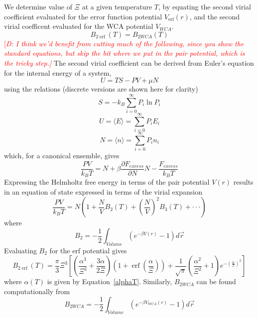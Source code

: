 \documentclass[double,12pt]{beavtex}
\newcommand\davidsays[1]{\textcolor{red}{[\it D: #1]}}
\begin{document}
We determine value of $\Xi$ at a given temperature $T$,
by equating the second virial coefficient evaluated for the error function 
potential $V_{\operatorname{erf}}(r)$, and the second virial coefficent evaluated for the 
WCA potential $V_{WCA}$.
\begin{equation}B_{2\operatorname{erf}}(T) =B_{2WCA}(T)\end{equation}
\davidsays{I think we'd benefit from cutting much of the following, since you
show the standard equations, but skip the bit where we put in the pair potential,
which is the tricky step.}
The second virial coefficient can be derived from Euler's equation for 
the internal energy of a system, 
\begin{equation}U=TS-PV+\mu{N}\end{equation}
using the relations (discrete versions are shown here for clarity)
\begin{equation}S=-k_B\sum_{i=0}^\infty{P_i\ln{P_i}}\end{equation}
\begin{equation}U=\langle E\rangle=\sum_{i=0}^\infty{P_iE_i}\end{equation}
\begin{equation}N=\langle n\rangle=\sum_{i=0}^\infty{P_in_i}\end{equation}
which, for a canonical ensemble, gives
\begin{equation}\frac{PV}{k_BT}=N + \beta\frac{\partial{F}_{excess}}{\partial{N}}{N} - \frac{F_{excess}}{k_BT}\end{equation}
Expressing the Helmholtz free energy in terms of the pair potential 
$V(r)$ results in an equation of state expressed in terms of the virial expansion 
\begin{equation}\label{virialequation}
    \frac{PV}{k_BT}=N\left(1+\frac{N}{V}B_2(T)+\left(\frac{N}{V}\right)^2B_3(T)+ \cdot\cdot\cdot\right) 
\end{equation}
where 
\begin{equation}
	B_{2}=-\frac{1}{2}\int_{Volume}\left(e^{-\beta{V}(r)}-1\right)d\vec{r} 
\end{equation}
Evaluating $B_{2}$ for the erf potential gives
\begin{equation}
	B_{2\operatorname{erf}}(T) = \frac{\pi}{3}\Xi^3\left[\left(\frac{\alpha^3}{\Xi^3}+\frac{3\alpha}{2\Xi}\right)\left(1+\operatorname{\operatorname{erf}}\left(\frac{\alpha}{\Xi}\right)\right)+\frac{1}{\sqrt{\pi}}\left(\frac{\alpha^2}{\Xi^2}+1\right)e^{-\left(\frac{\alpha}{\Xi}\right)^2}\right]
\end{equation}
where $\alpha(T)$ is given by Equation~\ref{alphaT}. Similarly, 
$B_{2WCA}$ can be found computationally from 
\begin{equation}
	B_{2WCA}=-\frac{1}{2}\int_{Volume}\left(e^{-\beta{V}_{WCA}(r)}-1\right)d\vec{r} 
\end{equation}
\end{document}
